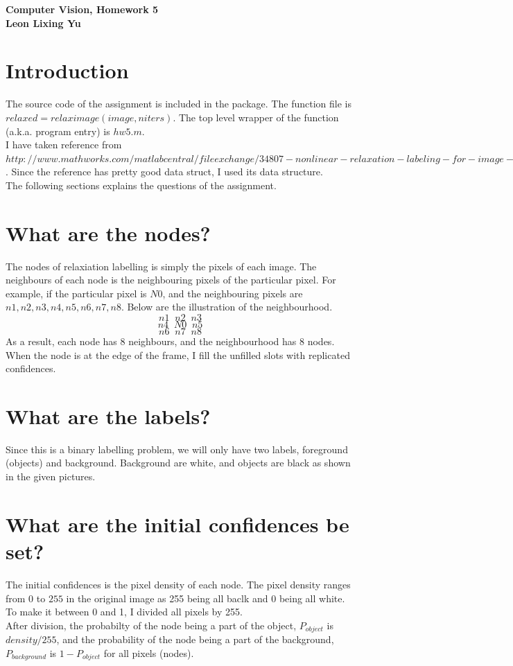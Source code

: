 \documentclass[twoside]{article}
\theoremstyle{definition}
\theoremstyle{definition}
\theoremstyle{remark}
\begin{document}
\textbf{Computer Vision, Homework 5}\\
\textbf{Leon Lixing Yu}\\

\section{Introduction}
The source code of the assignment is included in the package. The function file is $relaxed = relaximage(image, niters)$. The top level wrapper of the function (a.k.a. program entry) is $hw5.m$.\\
I have taken reference from $http://www.mathworks.com/matlabcentral/fileexchange/34807-nonlinear-relaxation-labeling-for-image-processing$. Since the reference has pretty good data struct, I used its data structure.\\
The following sections explains the questions of the assignment.\\
\section{What are the nodes?}
The nodes of relaxiation labelling is simply the pixels of each image. The neighbours of each node is the neighbouring pixels of the particular pixel. For example, if the particular pixel is $N0$, and the neighbouring pixels are $n1, n2, n3, n4, n5, n6, n7, n8$. Below are the illustration of the neighbourhood.
\[n1\;\;n2\;\;n3\]
\[n4\;\;N0\;\;n5\]
\[n6\;\;n7\;\;n8\]
As a result, each node has 8 neighbours, and the neighbourhood has 8 nodes. When the node is at the edge of the frame, I fill the unfilled slots with replicated confidences.\\
\section{What are the labels?}
Since this is a binary labelling problem, we will only have two labels, foreground (objects) and background. Background are white, and objects are black as shown in the given pictures. 
\section{What are the initial confidences be set?}
The initial confidences is the pixel density of each node. The pixel density ranges from $0$ to $255$ in the original image as 255 being all baclk and 0 being all white. To make it between 0 and 1, I divided all pixels by 255. \\
After division, the probabilty of the node being a part of the object, $P_{object}$ is $density/255$, and the probability of the node being a part of the background, $P_{background}$ is $1 - P_{object}$ for all pixels (nodes).
\end{document}
